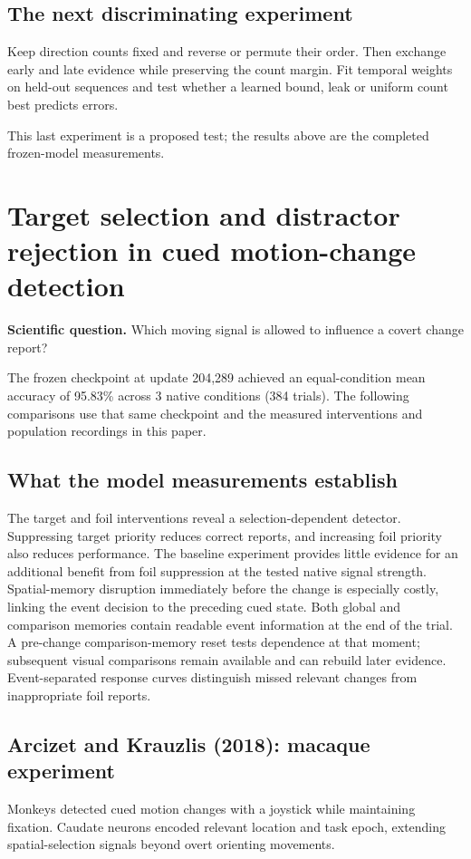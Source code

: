 \documentclass[11pt]{article}
\begin{document}
\subsection{The next discriminating experiment}
Keep direction counts fixed and reverse or permute their order. Then exchange early and late evidence while preserving the count margin. Fit temporal weights on held-out sequences and test whether a learned bound, leak or uniform count best predicts errors.

This last experiment is a proposed test; the results above are the completed frozen-model measurements.
\clearpage\section{Target selection and distractor rejection in cued motion-change detection}
\textbf{Scientific question.} Which moving signal is allowed to influence a covert change report?

The frozen checkpoint at update 204,289 achieved an equal-condition mean accuracy of 95.83\% across 3 native conditions (384 trials). The following comparisons use that same checkpoint and the measured interventions and population recordings in this paper.

\subsection{What the model measurements establish}
The target and foil interventions reveal a selection-dependent detector. Suppressing target priority reduces correct reports, and increasing foil priority also reduces performance. The baseline experiment provides little evidence for an additional benefit from foil suppression at the tested native signal strength. Spatial-memory disruption immediately before the change is especially costly, linking the event decision to the preceding cued state. Both global and comparison memories contain readable event information at the end of the trial. A pre-change comparison-memory reset tests dependence at that moment; subsequent visual comparisons remain available and can rebuild later evidence. Event-separated response curves distinguish missed relevant changes from inappropriate foil reports.

\subsection{Arcizet and Krauzlis (2018): macaque experiment}
Monkeys detected cued motion changes with a joystick while maintaining fixation. Caudate neurons encoded relevant location and task epoch, extending spatial-selection signals beyond overt orienting movements. \cite{bio_arcizet}
\end{document}
